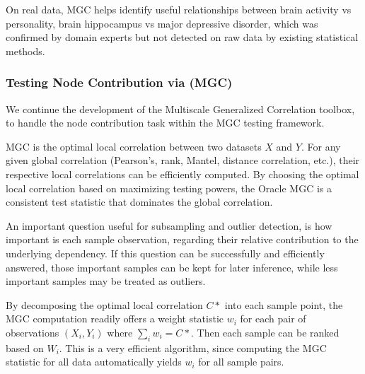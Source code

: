 \documentclass[simplex.tex]{subfiles}
\begin{document}
On real data, MGC helps identify useful relationships between brain
activity vs personality, brain hippocampus vs major depressive disorder,
which was confirmed by domain experts but not detected on raw data by
existing statistical methods. 

\subsubsection{Testing Node Contribution via (MGC)} We continue the
development of the Multiscale Generalized Correlation toolbox, to handle
the node contribution task within the MGC testing framework. 

MGC is the optimal local correlation between two datasets $X$ and $Y$.
For any given global correlation (Pearson’s, rank, Mantel, distance
correlation, etc.), their respective local correlations can be
efficiently computed. By choosing the optimal local correlation based on
maximizing testing powers, the Oracle MGC is a consistent test statistic
that dominates the global correlation.

An important question useful for subsampling and outlier detection, is
how important is each sample observation, regarding their relative
contribution to the underlying dependency. If this question can be
successfully and efficiently answered, those important samples can be
kept for later inference, while less important samples may be treated as
outliers. 

By decomposing the optimal local correlation $C*$ into each sample
point, the MGC computation readily offers a weight statistic $w_i$ for
each pair of observations $(X_i,Y_i)$ where $\sum_i{w_i} = C*$.  Then
each sample can be ranked based on $W_i$.  This is a very efficient
algorithm, since computing the MGC statistic for all data automatically
yields $w_i$ for all sample pairs.
\end{document}

